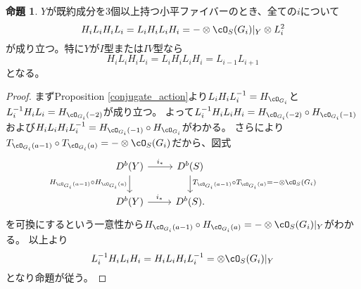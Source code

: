 \documentclass[uplatex, a4paper, dvipdfmx]{jsarticle}
\theoremstyle{definition}
\newtheorem{proposition}[theorem]{命題}
\begin{document}
\begin{proposition}\label{HLHL}
    $Y$が既約成分を3個以上持つ小平ファイバーのとき、全ての$i$について
    \begin{equation}
        H_iL_iH_iL_i = L_iH_iL_iH_i = -\otimes \cO_S(G_i)\vert_Y \otimes L_i^2
    \end{equation}
    が成り立つ。特に$Y$が$I$型または$IV$型なら
    \begin{equation}
        H_iL_iH_iL_i = L_iH_iL_iH_i = L_{i-1}L_{i+1}
    \end{equation}
    となる。
\end{proposition}
\begin{proof}
    まずProposition \ref{conjugate_action}より$L_iH_iL_i^{-1}=H_{\cO_{G_i}}$と$L_i^{-1}H_iL_i=H_{\cO_{G_i}(-2)}$が成り立つ。
    よって$L_i^{-1}H_iL_iH_i = H_{\cO_{G_i}(-2)} \circ H_{\cO_{G_i}(-1)}$および$H_iL_iH_iL_i^{-1} = H_{\cO_{G_i}(-1)} \circ H_{\cO_{G_i}}$がわかる。
    さらに\cite[Lemma3.15]{MR2198807}より$T_{\cO_{G_i}(a-1)}\circ T_{\cO_{G_i}(a)} = - \otimes \cO_S(G_i)$だから、図式
    \begin{equation}
        \begin{tikzcd}
            D^b(Y) \arrow[r,"i_*"]\arrow[d, "H_{\cO_{G_i}(a-1)}\circ H_{\cO_{G_i}(a)}"'] & D^b(S) \arrow[d,"T_{\cO_{G_i}(a-1)}\circ T_{\cO_{G_i}(a)}= - \otimes \cO_S(G_i)"]\\
            D^b(Y) \arrow[r, "i_*"]& D^b(S).
        \end{tikzcd}
    \end{equation}
    を可換にするという一意性から$H_{\cO_{G_i}(a-1)}\circ H_{\cO_{G_i}(a)} = - \otimes \cO_S(G_i)\vert_Y$がわかる。
    以上より
    \begin{equation}
        L_i^{-1}H_iL_iH_i =H_iL_iH_iL_i^{-1} = \otimes \cO_S(G_i)\vert_Y
    \end{equation}
    となり命題が従う。
\end{proof}
\end{document}
